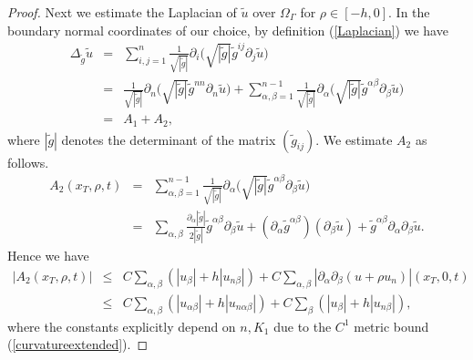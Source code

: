 \documentclass[11pt,letterpaper]{amsart}
\numberwithin{equation}{section}
\theoremstyle{definition}
\theoremstyle{plain}
\theoremstyle{definition}
\theoremstyle{plain}
\theoremstyle{definition}
\theoremstyle{plain}
\begin{document}
\begin{proof}
Next we estimate the Laplacian of $\widetilde{u}$ over $\Omega_{\Gamma}$ for $\rho\in[-h,0]$. In the boundary normal coordinates of our choice, by definition (\ref{Laplacian}) we have
\begin{eqnarray*}
\Delta_{\widetilde{g}}\widetilde{u}&=&\sum_{i,j=1}^n \frac{1}{\sqrt{|\widetilde{g}|}} \partial_i \big(\sqrt{|\widetilde{g}|} \widetilde{g}^{ij}\partial_j \widetilde{u} \big) \\
&=& \frac{1}{\sqrt{|\widetilde{g}|}} \partial_{n} \big(\sqrt{|\widetilde{g}|} \widetilde{g}^{nn}\partial_{n} \widetilde{u}\big)+
\sum_{\alpha,\beta=1}^{n-1} \frac{1}{\sqrt{|\widetilde{g}|}} \partial_{\alpha} \big(\sqrt{|\widetilde{g}|} \widetilde{g}^{\alpha\beta}\partial_{\beta} \widetilde{u} \big) \\
&=& A_1+A_2,
\end{eqnarray*}
where $|\widetilde{g}|$ denotes the determinant of the matrix $(\widetilde{g}_{ij})$. We estimate $A_2$ as follows.
\begin{eqnarray*}
A_2(x_T,\rho,t) &=& \sum_{\alpha,\beta=1}^{n-1} \frac{1}{\sqrt{|\widetilde{g}|}} \partial_{\alpha} \big(\sqrt{|\widetilde{g}|} \widetilde{g}^{\alpha\beta}\partial_{\beta} \widetilde{u} \big) \\
&=& \sum_{\alpha,\beta} \frac{\partial_{\alpha} |\widetilde{g}|}{2|\widetilde{g}|}  \widetilde{g}^{\alpha \beta} \partial_{\beta}\widetilde{u}+ (\partial_{\alpha} \widetilde{g}^{\alpha \beta})( \partial_{\beta}\widetilde{u})+ \widetilde{g}^{\alpha \beta} \partial_{\alpha}\partial_{\beta}\widetilde{u}.
\end{eqnarray*}
Hence we have
\begin{eqnarray*}
|A_2(x_T,\rho,t)| &\leqslant& C \sum_{\alpha,\beta} (|u_{\beta}|+h |u_{n\beta}|)+C \sum_{\alpha,\beta}|\partial_{\alpha}\partial_{\beta}(u+\rho u_n)|(x_T,0,t)\\
&\leqslant& C\sum_{\alpha,\beta} (|u_{\alpha\beta}|+h |u_{n\alpha\beta}|)+C\sum_{\beta}(|u_{\beta}|+h|u_{n\beta}|),
\end{eqnarray*}
where the constants explicitly depend on $n,K_1$ due to the $C^1$ metric bound (\ref{curvatureextended}).


\end{proof}
\end{document}
